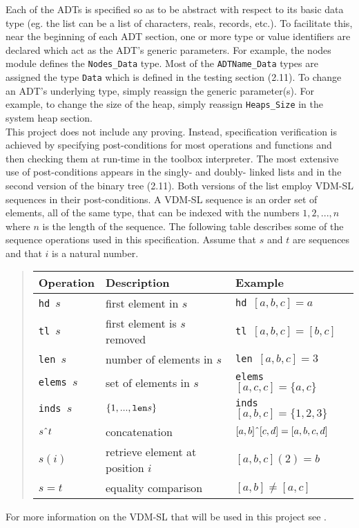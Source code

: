 \documentclass[11pt]{article}
\begin{document}
Each of the ADTs is specified so as to be abstract with respect to its basic data type (eg.  the list can be a list of characters, reals, records, etc.).  To facilitate this, near the beginning of each ADT section, one or more type or value identifiers are declared which act as the ADT's generic parameters.  For example, the nodes module defines the {\tt Nodes\_Data} type.  Most of the {\tt ADTName\_Data} types  are assigned the type {\tt Data} which is defined in the testing section (2.11).  To change an ADT's underlying type, simply reassign the generic parameter(s).  For example, to change the size of the heap, simply reassign {\tt Heaps\_Size} in the system heap section.\\

This project does not include any proving.  Instead, specification verification is achieved by specifying post-conditions for most operations and functions and then checking them at run-time in the toolbox interpreter.  The most extensive use of post-conditions appears in the singly- and doubly- linked lists and in the second version of the binary tree (2.11).  Both versions of the list employ VDM-SL sequences in their post-conditions.  A VDM-SL sequence is an order set of elements, all of the same type, that can be indexed with the numbers $1, 2, ..., n$ where $n$ is the length of the sequence.  The following table describes some of the sequence operations used in this specification.  Assume that $s$ and $t$ are sequences and that $i$ is a natural number.
\begin{quote}
\begin{tabular}{|l|l|l|}
\hline
Operation&Description&Example\\
\hline
{\tt hd }$s$&first element in $s$&{\tt hd }$[a, b, c] = a$\\
{\tt tl }$s$&first element is $s$ removed&{\tt tl }$[a, b, c] = [b, c]$\\
{\tt len }$s$&number of elements in $s$&{\tt len }$[a, b, c] = 3$\\
{\tt elems }$s$&set of elements in $s$&{\tt elems }$[a, c, c] = \{a, c\}$\\
{\tt inds }$s$&$\{1, ..., \mbox{{\tt len}} s\}$&{\tt inds }$[a, b, c] = \{1, 2, 3\}$\\
$s\char94t$&concatenation&$[a, b]\char94[c, d] = [a, b, c,d]$\\
$s(i)$&retrieve element at position $i$&$[a, b, c](2) = b$\\
$s = t$&equality comparison&$[a, b] \not= [a, c]$\\
\hline
\end{tabular}
\end{quote}
For more information on the VDM-SL that will be used in this project see \cite{VDMSL}.\\
\end{document}
